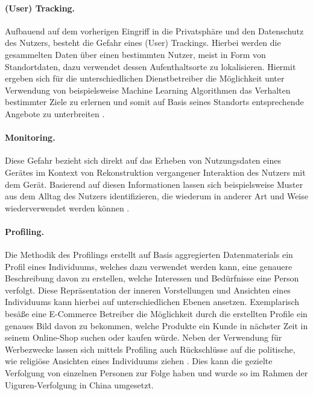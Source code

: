 \paragraph{(User) Tracking.}
\label{sec:Grundlagen:para:User Tracking}
Aufbauend auf dem vorherigen Eingriff in die Privatsphäre und den Datenschutz des Nutzers, besteht die Gefahr eines (User) Trackings. Hierbei werden die gesammelten Daten über einen bestimmten Nutzer, meist in Form von Standortdaten, dazu verwendet dessen Aufenthaltsorte zu lokalisieren. Hiermit ergeben sich für die unterschiedlichen Dienstbetreiber die Möglichkeit unter Verwendung von beispielsweise Machine Learning Algorithmen das Verhalten bestimmter Ziele zu erlernen und somit auf Basis seines Standorts entsprechende Angebote zu unterbreiten \cite{Seliem2018}.

\paragraph{Monitoring.}
\label{sec:Grundlagen:para:Monitoring}
Diese Gefahr bezieht sich direkt auf das Erheben von Nutzungsdaten eines Gerätes im Kontext von Rekonstruktion vergangener Interaktion des Nutzers mit dem Gerät. Basierend auf diesen Informationen lassen sich beispielsweise Muster aus dem Alltag des Nutzers identifizieren, die wiederum in anderer Art und Weise wiederverwendet werden können \cite{Seliem2018}.

\paragraph{Profiling.}
\label{sec:Grundlagen:para:Profiling}
Die Methodik des Profilings erstellt auf Basis aggregierten Datenmaterials ein Profil eines Individuums, welches dazu verwendet werden kann, eine genauere Beschreibung davon zu erstellen, welche Interessen und Bedürfnisse eine Person verfolgt. Diese Repräsentation der inneren Vorstellungen und Ansichten eines Individuums kann hierbei auf unterschiedlichen Ebenen ansetzen. Exemplarisch besäße eine E-Commerce Betreiber die Möglichkeit durch die erstellten Profile ein genaues Bild davon zu bekommen, welche Produkte ein Kunde in nächster Zeit in seinem Online-Shop suchen oder kaufen würde.
Neben der Verwendung für Werbezwecke lassen sich mittels Profiling auch Rückschlüsse auf die politische, wie religiöse Ansichten eines Individuums ziehen \cite{Seliem2018}. Dies kann die gezielte Verfolgung von einzelnen Personen zur Folge haben und wurde so im Rahmen der Uiguren-Verfolgung in China umgesetzt.

